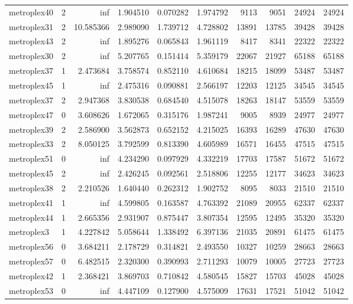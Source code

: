 \begin{longtable}{|l|r|r|r|r|r|r|r|r|r|}
metroplex40 & 2 & inf & 1.904510 & 0.070282 & 1.974792 & 9113 & 9051 & 24924 & 24924 \\
metroplex31 & 2 & 10.585366 & 2.989090 & 1.739712 & 4.728802 & 13891 & 13785 & 39428 & 39428 \\
metroplex43 & 2 & inf & 1.895276 & 0.065843 & 1.961119 & 8417 & 8341 & 22322 & 22322 \\
metroplex30 & 2 & inf & 5.207765 & 0.151414 & 5.359179 & 22067 & 21927 & 65188 & 65188 \\
metroplex37 & 1 & 2.473684 & 3.758574 & 0.852110 & 4.610684 & 18215 & 18099 & 53487 & 53487 \\
metroplex45 & 1 & inf & 2.475316 & 0.090881 & 2.566197 & 12203 & 12125 & 34545 & 34545 \\
metroplex37 & 2 & 2.947368 & 3.830538 & 0.684540 & 4.515078 & 18263 & 18147 & 53559 & 53559 \\
metroplex47 & 0 & 3.608626 & 1.672065 & 0.315176 & 1.987241 & 9005 & 8939 & 24977 & 24977 \\
metroplex39 & 2 & 2.586900 & 3.562873 & 0.652152 & 4.215025 & 16393 & 16289 & 47630 & 47630 \\
metroplex33 & 2 & 8.050125 & 3.792599 & 0.813390 & 4.605989 & 16571 & 16455 & 47515 & 47515 \\
metroplex51 & 0 & inf & 4.234290 & 0.097929 & 4.332219 & 17703 & 17587 & 51672 & 51672 \\
metroplex45 & 2 & inf & 2.426245 & 0.092561 & 2.518806 & 12255 & 12177 & 34623 & 34623 \\
metroplex38 & 2 & 2.210526 & 1.640440 & 0.262312 & 1.902752 & 8095 & 8033 & 21510 & 21510 \\
metroplex41 & 1 & inf & 4.599805 & 0.163587 & 4.763392 & 21089 & 20955 & 62337 & 62337 \\
metroplex44 & 1 & 2.665356 & 2.931907 & 0.875447 & 3.807354 & 12595 & 12495 & 35320 & 35320 \\
metroplex3 & 1 & 4.227842 & 5.058644 & 1.338492 & 6.397136 & 21035 & 20891 & 61475 & 61475 \\
metroplex56 & 0 & 3.684211 & 2.178729 & 0.314821 & 2.493550 & 10327 & 10259 & 28663 & 28663 \\
metroplex57 & 0 & 6.482515 & 2.320300 & 0.390993 & 2.711293 & 10079 & 10005 & 27723 & 27723 \\
metroplex42 & 1 & 2.368421 & 3.869703 & 0.710842 & 4.580545 & 15827 & 15703 & 45028 & 45028 \\
metroplex53 & 0 & inf & 4.447109 & 0.127900 & 4.575009 & 17631 & 17521 & 51042 & 51042 \\

\end{longtable}
